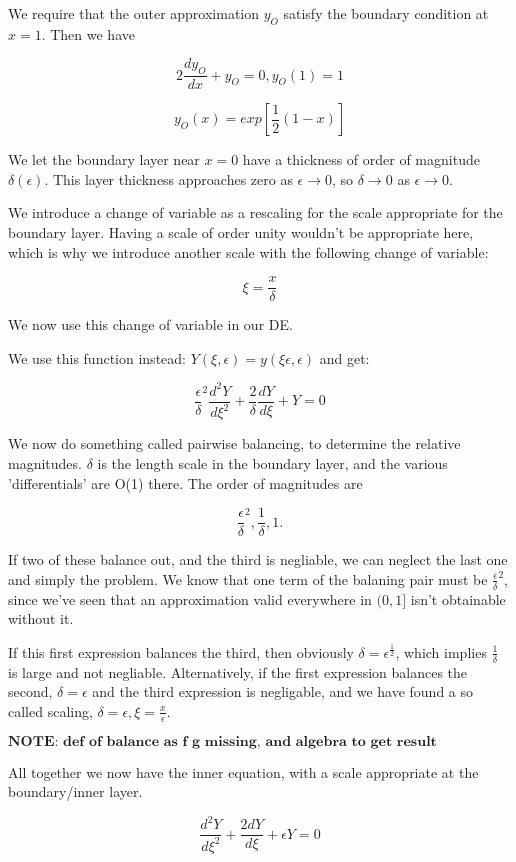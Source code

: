 \documentclass[12pt]{report}
\begin{document}
We require that the outer approximation $y_O$ satisfy the boundary condition at
$x=1$. Then we have

$$2 \frac{dy_O}{dx} + y_O = 0, y_O(1)=1$$

$$y_O(x) = exp[\frac 1 2 (1-x)]$$

We let the boundary layer near $x=0$ have a thickness of order of magnitude
$\delta(\epsilon)$. This layer thickness approaches zero as $\epsilon \to 0$, so
$\delta \to 0$ as $\epsilon \to 0$.

We introduce a change of variable as a rescaling for the scale appropriate for
the boundary layer. Having a scale of order unity wouldn't be appropriate here,
which is why we introduce another scale with the following change of variable:

$$\xi = \frac x \delta$$

We now use this change of variable in our DE.

We use this function instead: $Y(\xi, \epsilon) = y(\xi \epsilon, \epsilon)$ and
get:

$$\frac \epsilon \delta^2 \frac{d^2Y}{d\xi^2} + \frac 2 \delta \frac{dY}{d\xi}
+ Y = 0$$

We now do something called pairwise balancing, to determine the relative
magnitudes. $\delta$ is the length scale in the boundary layer, and the various
'differentials' are O(1) there. The order of magnitudes are

$$\frac \epsilon \delta^2, \frac 1 \delta, 1.$$

If two of these balance out, and the third is negliable, we can neglect
the last one and simply the problem. We know that one term of the balaning pair
must be $\frac \epsilon \delta^2$, since we've seen that an approximation valid
everywhere in $(0,1]$ isn't obtainable without it.

If this first expression balances the third, then obviously $\delta =
\epsilon^{\frac 1 2}$, which implies $\frac 1 \delta$ is large and not
negliable. Alternatively, if the first expression balances the second, $\delta =
\epsilon$ and the third expression is negligable, and we have found a so called
scaling, $\delta = \epsilon, \xi=\frac x \epsilon$.

$\textbf{NOTE: def of balance as f~g missing, and algebra to get result}$

All together we now have the inner equation, with a scale appropriate at the
boundary/inner layer.

$$\frac{d^2Y}{d\xi^2} + \frac{2dY}{d\xi} + \epsilon Y = 0$$
\end{document}
